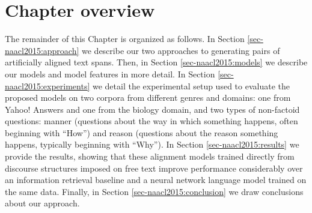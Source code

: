 \section{Chapter overview}

The remainder of this Chapter is organized as follows.  In Section \ref{sec-naacl2015:approach} we describe our two approaches to generating pairs of artificially aligned text spans.  Then, in Section \ref{sec-naacl2015:models} we describe our models and model features in more detail.  In Section \ref{sec-naacl2015:experiments} we detail the experimental setup used to evaluate the proposed models on two corpora from different genres and domains: one from Yahoo! Answers and one from the biology domain, and two types of non-factoid questions: manner (questions about the way in which something happens, often beginning with ``How'') and reason (questions about the reason something happens, typically beginning with ``Why'').  In Section \ref{sec-naacl2015:results} we provide the results, showing that these alignment models trained directly from discourse structures imposed on free text
improve performance considerably over an information retrieval baseline and a neural network language model trained on the same data.  Finally, in Section \ref{sec-naacl2015:conclusion} we draw conclusions about our approach.

%
%
%
%
%


